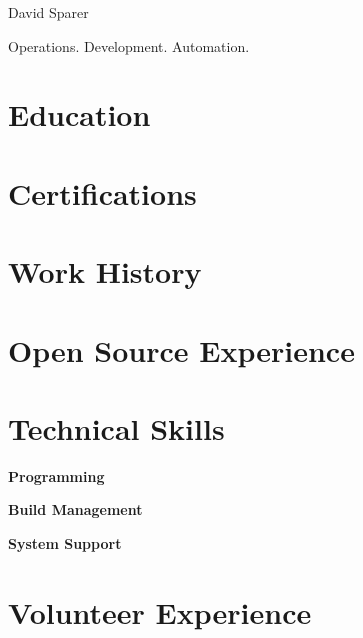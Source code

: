 \documentclass{cls/res}
\begin{document}
	\thispagestyle{empty} %

	\begin{resume}
		\vspace{-0.5in}
		\begin{minipage}[c]{0.78\textwidth}
			\centerline{{\Huge David Sparer}}
			\vspace{.2in}
			\centerline{Operations. Development. Automation.}
		\end{minipage}
		\begin{minipage}[c]{0.25\textwidth}
			
		\end{minipage}

		\section{Education}
			\vspace{0.1in}
			

		\section{Certifications}
			\vspace{0.1in}
			

		\section{Work History}
			
			
			
			
			
			

		\section{Open Source Experience}
			\vspace{0.1in}
			

		\section{Technical Skills}
			\vspace{0.1in}
			{\bf Programming}
				
			{\bf Build Management}
				
			{\bf System Support}
				

		\section{Volunteer Experience}
			\vspace{0.1in}
			
			
	\end{resume}
\end{document}
